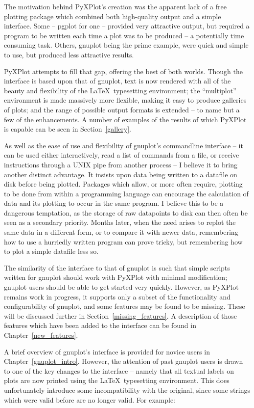 \documentclass[a4paper,onecolumn,11pt]{book}
\begin{document}
The motivation behind PyXPlot's creation was the apparent lack of a free
plotting package which combined both high-quality output and a simple
interface.  Some -- pgplot for one -- provided very attractive output, but
required a program to be written each time a plot was to be produced -- a
potentially time consuming task. Others, gnuplot being the prime example, were
quick and simple to use, but produced less attractive results.

PyXPlot attempts to fill that gap, offering the best of both worlds. Though the
interface is based upon that of gnuplot, text is now rendered with all of the
beauty and flexibility of the \LaTeX\ typesetting environment; the
``multiplot'' environment is made massively more flexible, making it easy to
produce galleries of plots; and the range of possible output formats is
extended -- to name but a few of the enhancements. A number of examples of the
results of which PyXPlot is capable can be seen in Section~\ref{gallery}.

As well as the ease of use and flexibility of gnuplot's commandline interface
-- it can be used either interactively, read a list of commands from a file, or
receive instructions through a UNIX pipe from another process -- I believe it
to bring another distinct advantage. It insists upon data being written to a
datafile on disk before being plotted. Packages which allow, or more often
require, plotting to be done from within a programming language can encourage
the calculation of data and its plotting to occur in the same program. I
believe this to be a dangerous temptation, as the storage of raw datapoints to
disk can then often be seen as a secondary priority. Months later, when the
need arises to replot the same data in a different form, or to compare it with
newer data, remembering how to use a hurriedly written program can prove
tricky, but remembering how to plot a simple datafile less so.

The similarity of the interface to that of gnuplot is such that simple scripts
written for gnuplot should work with PyXPlot with minimal modification; gnuplot
users should be able to get started very quickly.  However, as PyXPlot remains
work in progress, it supports only a subset of the functionality and
configurability of gnuplot, and some features may be found to be missing.
These will be discussed further in Section~\ref{missing_features}. A
description of those features which have been added to the interface can be
found in Chapter~\ref{new_features}.

A brief overview of gnuplot's interface is provided for novice users in
Chapter~\ref{gnuplot_intro}. However, the attention of past gnuplot users is
drawn to one of the key changes to the interface -- namely that all textual
labels on plots are now printed using the \LaTeX\ typesetting environment. This
does unfortunately introduce some incompatibility with the original, since some
strings which were valid before are no longer valid. For example:
\end{document}

